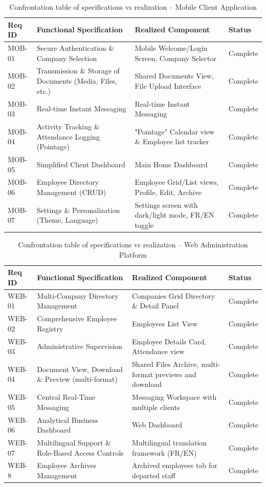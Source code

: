 \begin{table}[H]
\centering
\caption{Confrontation table of specifications vs realization -- Mobile Client Application}
\label{tab:confrontation_mobile}
\begin{tabular}{|l|p{5cm}|p{5.5cm}|l|}
\hline
\textbf{Req ID} & \textbf{Functional Specification} & \textbf{Realized Component} & \textbf{Status} \\
\hline
MOB-01 & Secure Authentication \& Company Selection & Mobile Welcome/Login Screen, Company Selector & Complete \\
\hline
MOB-02 & Transmission \& Storage of Documents (Media, Files, etc.) & Shared Documents View, File Upload Interface & Complete \\
\hline
MOB-03 & Real-time Instant Messaging & Real-time Instant Messaging & Complete \\
\hline
MOB-04 & Activity Tracking \& Attendance Logging (Pointage) & "Pointage" Calendar view \& Employee list tracker & Complete \\
\hline
MOB-05 & Simplified Client Dashboard & Main Home Dashboard & Complete \\
\hline
MOB-06 & Employee Directory Management (CRUD) & Employee Grid/List views, Profile, Edit, Archive & Complete \\
\hline
MOB-07 & Settings \& Personalization (Theme, Language) & Settings screen with dark/light mode, FR/EN toggle & Complete \\
\hline
\end{tabular}
\end{table}

\begin{table}[H]
\centering
\caption{Confrontation table of specifications vs realization -- Web Administration Platform}
\label{tab:confrontation_web}
\begin{tabular}{|l|p{5cm}|p{5.5cm}|l|}
\hline
\textbf{Req ID} & \textbf{Functional Specification} & \textbf{Realized Component} & \textbf{Status} \\
\hline
WEB-01 & Multi-Company Directory Management & Companies Grid Directory \& Detail Panel & Complete \\
\hline
WEB-02 & Comprehensive Employee Registry & Employees List View & Complete \\
\hline
WEB-03 & Administrative Supervision & Employee Details Card, Attendance view & Complete \\
\hline
WEB-04 & Document View, Download \& Preview (multi-format) & Shared Files Archive, multi-format previews and download & Complete \\
\hline
WEB-05 & Central Real-Time Messaging & Messaging Workspace with multiple clients & Complete \\
\hline
WEB-06 & Analytical Business Dashboard & Web Dashboard & Complete \\
\hline
WEB-07 & Multilingual Support \& Role-Based Access Controls & Multilingual translation framework (FR/EN) & Complete \\
\hline
WEB-8 & Employee Archives Management & Archived employees tab for departed staff & Complete \\
\hline
\end{tabular}
\end{table}

